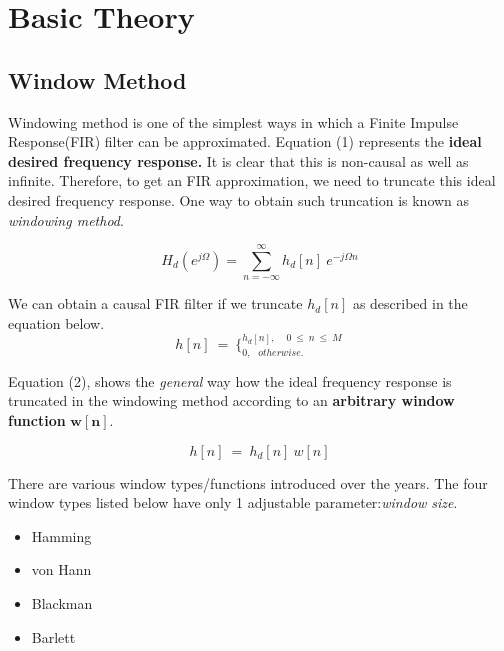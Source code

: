 \documentclass[11pt]{article}
\begin{document}
\newpage
\section{Basic Theory} 

\subsection{Window Method}

Windowing method is one of the simplest ways in which a Finite Impulse Response(FIR) filter can be approximated. 
Equation (1) represents the {\bf ideal desired frequency response.} It is clear that this is non-causal as well as infinite. Therefore, to get an FIR approximation, we need to truncate this ideal desired frequency response. One way to obtain such truncation is known as {\it windowing method}.

\begin{equation}
H_{d}\left( e^{j\Omega }\right) =\sum ^{\infty }_{n=-\infty } h_{d}[ n] \ e^{-j\Omega n}
\end{equation}


We can obtain a causal FIR filter if we truncate $h_{d}[n]$ as described in the equation below.
$$h[ n] \ =\ \bigl\{^{h_{d}[ n] ,\ \ \ \ \ 0\ \leqslant \ n\ \leqslant \ M\ }_{0,\ \ \ otherwise.\ }$$

Equation (2), shows the {\it general} way how the ideal frequency response is truncated in the windowing method according to an {\bf arbitrary window function} $\mathbf{w[n]}.$

\begin{equation}
    h[ n] \ =\ h_{d}[ n] \ w[ n]
\end{equation}

There are various window types/functions introduced over the years. The four window types listed below have only 1 adjustable parameter:{\it window size}.
\begin{itemize}
	\item Hamming
	\item von Hann
	\item Blackman
	\item Barlett
\end{itemize}
\end{document}
